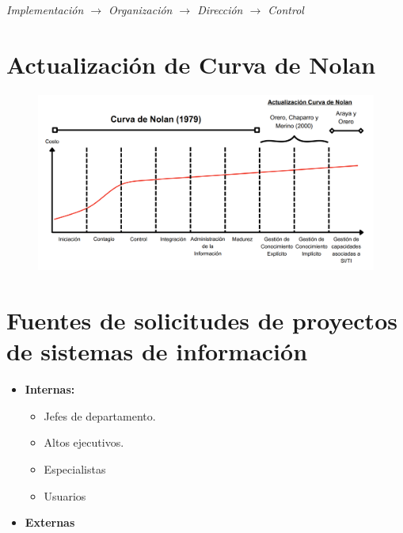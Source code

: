 \documentclass{templateNote}
\begin{document}
\begin{center}
    \textit{Implementación $\rightarrow$ Organización $\rightarrow$ Dirección $\rightarrow$ Control}
    \section*{Actualización de Curva de Nolan}
    \begin{figure}[H]
        \centering
        \vspace*{\fill}
        \includegraphics[width=1\textwidth,height=1.3\textheight,keepaspectratio]{img/CurvaDeNolanActualizada.png}
        \vspace*{\fill}
    \end{figure}
\end{center}
\newpage
% 

\section{Fuentes de solicitudes de proyectos de sistemas de información}
\begin{itemize}
    \item \textbf{Internas:}
    \begin{itemize}
        \item Jefes de departamento.
        \item Altos ejecutivos.
        \item Especialistas
        \item Usuarios
    \end{itemize}
    \item \textbf{Externas} 
\end{itemize}
\newpage
\end{document}
